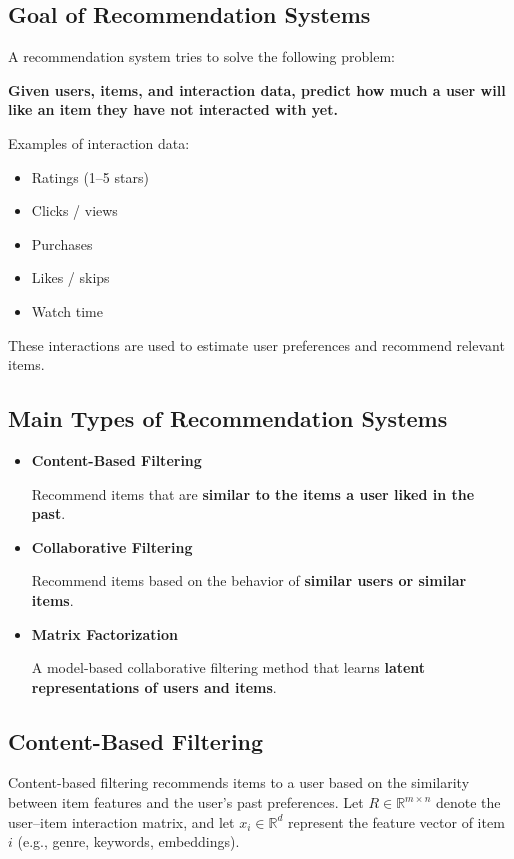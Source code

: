 \documentclass[10pt,a4paper]{article}
\begin{document}
	\subsection{Goal of Recommendation Systems}

	A recommendation system tries to solve the following problem:

	\textbf{Given users, items, and interaction data, predict how much a user will like an item they have not interacted with yet.}


	Examples of interaction data:

	\begin{itemize}
		\item Ratings (1–5 stars)
		\item Clicks / views
		\item Purchases
		\item Likes / skips
		\item Watch time
	\end{itemize}

	These interactions are used to estimate user preferences and recommend relevant items.

	\subsection{Main Types of Recommendation Systems}

	\begin{itemize}

		\item \textbf{Content-Based Filtering}

		Recommend items that are \textbf{similar to the items a user liked in the past}.

		\item \textbf{Collaborative Filtering}

		Recommend items based on the behavior of \textbf{similar users or similar items}.

		\item \textbf{Matrix Factorization}

		A model-based collaborative filtering method that learns \textbf{latent representations of users and items}.

	\end{itemize}

	\subsection{Content-Based Filtering}
	Content-based filtering recommends items to a user based on the similarity between item features and the user's past preferences. Let $R \in \mathbb{R}^{m \times n}$ denote the user--item interaction matrix, and let $x_i \in \mathbb{R}^{d}$ represent the feature vector of item $i$ (e.g., genre, keywords, embeddings).
\end{document}
